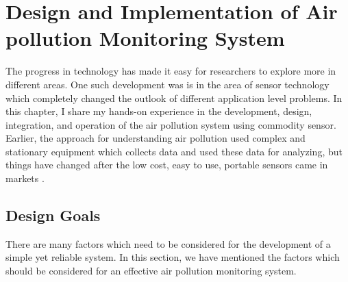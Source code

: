 \chapter{Design and Implementation of Air pollution Monitoring System}



The progress in technology has made it easy for researchers to explore more in different areas. One such development was is in the area of sensor technology which completely changed the outlook of different application level problems. In this chapter, I share my hands-on experience in the development, design, integration, and operation of the air pollution system using commodity sensor. Earlier, the approach for understanding air pollution used complex and stationary equipment which collects data and used these data for analyzing, but things have changed after the low cost, easy to use, portable sensors came in markets \cite{Snyder2013}. 

\section{Design Goals}

There are many factors which need to be considered for the development of a simple yet reliable system. In this section, we have mentioned the factors which should be considered for an effective air pollution monitoring system.

